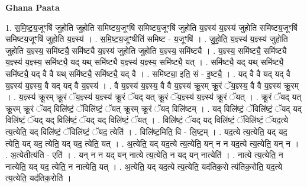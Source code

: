 \documentclass[17pt]{extarticle}
\begin{document}
\textbf{Ghana Paata } \newline

1. स॒मि॒ष्ट॒य॒जूꣳषि॑ जुहोति जुहोति समिष्टय॒जूꣳषि॑ समिष्टय॒जूꣳषि॑ जुहोति य॒ज्ञ्स्य॑ य॒ज्ञ्स्य॑ जुहोति समिष्टय॒जूꣳषि॑ समिष्टय॒जूꣳषि॑ जुहोति य॒ज्ञ्स्य॑ । . स॒मि॒ष्ट॒य॒जूꣳषीति॑ समिष्ट - य॒जूꣳषि॑ । . जु॒हो॒ति॒ य॒ज्ञ्स्य॑ य॒ज्ञ्स्य॑ जुहोति जुहोति य॒ज्ञ्स्य॒ समि॑ष्ट्यै॒ समि॑ष्ट्यै य॒ज्ञ्स्य॑ जुहोति जुहोति य॒ज्ञ्स्य॒ समि॑ष्ट्यै । . य॒ज्ञ्स्य॒ समि॑ष्ट्यै॒ समि॑ष्ट्यै य॒ज्ञ्स्य॑ य॒ज्ञ्स्य॒ समि॑ष्ट्यै॒ यद् यथ् समि॑ष्ट्यै य॒ज्ञ्स्य॑ य॒ज्ञ्स्य॒ समि॑ष्ट्यै॒ यत् । . समि॑ष्ट्यै॒ यद् यथ् समि॑ष्ट्यै॒ समि॑ष्ट्यै॒ यद् वै वै यथ् समि॑ष्ट्यै॒ समि॑ष्ट्यै॒ यद् वै । . समि॑ष्ट्या॒ इति॒ सं - इ॒ष्ट्यै॒ । . यद् वै वै यद् यद् वै य॒ज्ञ्स्य॑ य॒ज्ञ्स्य॒ वै यद् यद् वै य॒ज्ञ्स्य॑ । . वै य॒ज्ञ्स्य॑ य॒ज्ञ्स्य॒ वै वै य॒ज्ञ्स्य॑ क्रू॒रम् क्रू॒रं ॅय॒ज्ञ्स्य॒ वै वै य॒ज्ञ्स्य॑ क्रू॒रम् । . य॒ज्ञ्स्य॑ क्रू॒रम् क्रू॒रं ॅय॒ज्ञ्स्य॑ य॒ज्ञ्स्य॑ क्रू॒रं ॅयद् यत् क्रू॒रं ॅय॒ज्ञ्स्य॑ य॒ज्ञ्स्य॑ क्रू॒रं ॅयत् । . क्रू॒रं ॅयद् यत् क्रू॒रम् क्रू॒रं ॅयद् विलि॑ष्टं॒ ॅविलि॑ष्टं॒ ॅयत् क्रू॒रम् क्रू॒रं ॅयद् विलि॑ष्टम् । . यद् विलि॑ष्टं॒ ॅविलि॑ष्टं॒ ॅयद् यद् विलि॑ष्टं॒ ॅयद् यद् विलि॑ष्टं॒ ॅयद् यद् विलि॑ष्टं॒ ॅयत् । . विलि॑ष्टं॒ ॅयद् यद् विलि॑ष्टं॒ ॅविलि॑ष्टं॒ ॅयद॒त्ये त्य॒त्येति॒ यद् विलि॑ष्टं॒ ॅविलि॑ष्टं॒ ॅयद॒ त्येति॑ । . विलि॑ष्ट॒मिति॒ वि - लि॒ष्ट॒म् । . यद॒त्ये त्य॒त्येति॒ यद् यद॒ त्येति॒ यद् यद॒ त्येति॒ यद् यद॒ त्येति॒ यत् । . अ॒त्येति॒ यद् यद॒त्ये त्य॒त्येति॒ यन् न न यद॒त्ये त्य॒त्येति॒ यन् न । . अ॒त्येतीत्य॑ति - एति॑ । . यन् न न यद् यन् नात्ये त्य॒त्येति॒ न यद् यन् नात्येति॑ । . नात्ये त्य॒त्येति॒ न नात्येति॒ यद् यद॒ त्येति॒ न नात्येति॒ यत् । . अ॒त्येति॒ यद् यद॒त्ये त्य॒त्येति॒ यद॑तिक॒रो त्य॑तिक॒रोति॒ यद॒त्ये त्य॒त्येति॒ यद॑तिक॒रोति॑ । \newline
\end{document}
